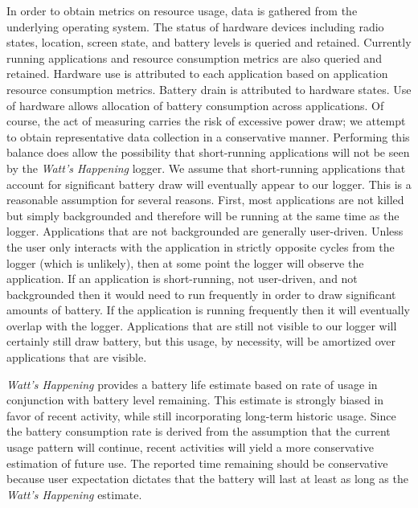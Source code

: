 In order to obtain metrics on resource usage, data is gathered from the underlying operating system.
The status of hardware devices including radio states, location, screen state, and battery levels is queried and retained.
Currently running applications and resource consumption metrics are also queried and retained. 
Hardware use is attributed to each application based on application resource consumption metrics. 
Battery drain is attributed to hardware states.
Use of hardware allows allocation of battery consumption across applications.
Of course, the act of measuring carries the risk of excessive power draw; we attempt to obtain representative data collection in a conservative manner.
Performing this balance does allow the possibility that short-running applications will not be seen by the \emph{Watt's Happening} logger.
We assume that short-running applications that account for significant battery draw will eventually appear to our logger.
This is a reasonable assumption for several reasons.
First, most applications are not killed but simply backgrounded and therefore will be running at the same time as the logger.
Applications that are not backgrounded are generally user-driven.
Unless the user only interacts with the application in strictly opposite cycles from the logger (which is unlikely), then at some point the logger will observe the application.
If an application is short-running, not user-driven, and not backgrounded then it would need to run frequently in order to draw significant amounts of battery.
If the application is running frequently then it will eventually overlap with the logger.
Applications that are still not visible to our logger will certainly still draw battery, but this usage, by necessity, will be amortized over applications that are visible.

\emph{Watt's Happening} provides a battery life estimate based on rate of usage in conjunction with battery level remaining.
This estimate is strongly biased in favor of recent activity, while still incorporating long-term historic usage. 
Since the battery consumption rate is derived from the assumption that the current usage pattern will continue, recent activities will yield a more conservative estimation of future use.
The reported time remaining should be conservative because user expectation dictates that the battery will last at least as long as the \emph{Watt's Happening} estimate.


